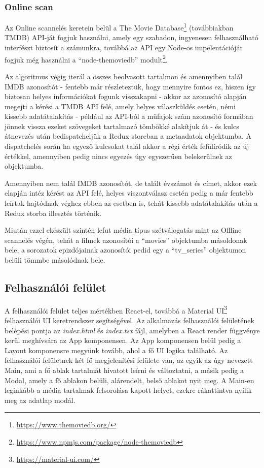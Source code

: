 \subsubsection{Online scan}
Az Online scannelés keretein belül a The Movie Database\footnote{\url{https://www.themoviedb.org/}} (továbbiakban TMDB) API-ját fogjuk használni, amely egy szabadon, ingyenesen felhasználható interfészt biztosít a számunkra, továbbá az API egy Node-os impelentációját fogjuk még használni a ``node-themoviedb'' modult\footnote{\url{https://www.npmjs.com/package/node-themoviedb}}.

Az algoritmus végig iterál a összes beolvasott tartalmon és amennyiben talál IMDB azonosítót - fentebb már részleteztük, hogy mennyire fontos ez, hiszen így biztosan helyes információkat fogunk visszakapni - akkor az azonosító alapján megejti a kérési a TMDB API felé, amely helyes válaszküldés esetén, némi kissebb adatátalakítás - például az API-ból a műfajok szám azonosító formában jönnek vissza ezeket szövegeket tartalmazó tömbökké alakítjuk át - és kulcs átnevezés után bedispatcheljük a Redux storeban a metaadatok objektumba. A dispatchelés során ha egyező kulcsokat talál akkor a régi érték felülíródik az új értékkel, amennyiben pedig nincs egyezés úgy egyszerűen belekerülnek az objektumba.

Amennyiben nem talál IMDB azonosítót, de talált évszámot és címet, akkor ezek elapján intéz kérést az API felé, helyes viszontválasz esetén pedig a már fentebb leírtak hajtódnak véghez ebben az esetben is, tehát kissebb adatátalakítás után a Redux storba illesztés történik.

Miután ezzel ekészült szintén lefut média típus szétválogatás mint az Offline scannelés végén, tehát a filmek azonosítói a ``movies'' objektumba másoldonak bele, a sorozatok epizdójainak azonosítói pedid egy a ``tv\_series'' objektumon belüli tömmbe másolódnak bele.

\subsection{Felhasználói felület}
A felhasználói felület teljes mértékben React-el, továbbá a Material UI\footnote{\url{https://material-ui.com/}} felhasználói UI keretrendszer segítségével. Az alkalmazás felhasználói felületének belépési pontja az {\it index.html} és {\it index.tsx} fájl, amelyben a React render függvénye kerül meghívsára az App komponensen. Az App komponensen belül pedig a Layout komponensre megyünk tovább, ahol a fő UI logika található.
Az felhasználói felületnek két fő megjelenítési felülete van, az egyik az úgy nevezett Main, ami a fő ablak tartalmát hivatott leírni és változtatni, a másik pedig a Modal, amely a fő ablakon belüli, alárendelt, belső ablakot nyit meg.
A Main-en leginkább a média tartalmak felsorolása kapott helyet, ezekre rákattintva nyílik meg az adatlap modál.

